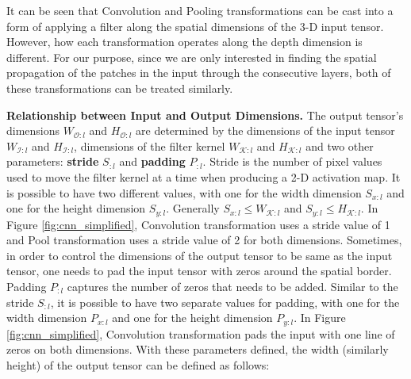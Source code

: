 

It can be seen that Convolution and Pooling transformations can be cast into a form of applying a filter along the spatial dimensions of the 3-D input tensor.
However, how each transformation operates along the depth dimension is different.
For our purpose, since we are only interested in finding the spatial propagation of the patches in the input through the consecutive layers, both of these transformations can be treated similarly.

\vspace{2mm}
\noindent \textbf{Relationship between Input and Output Dimensions.}
The output tensor's dimensions $W_{\mathcal{O}:l}$ and $H_{\mathcal{O}:l}$ are determined by the dimensions of the input tensor $W_{\mathcal{I}:l}$ and $H_{\mathcal{I}:l}$, dimensions of the filter kernel $W_{\mathcal{K}:l}$ and $H_{\mathcal{K}:l}$ and two other parameters: \textbf{stride} $S_{:l}$ and \textbf{padding} $P_{:l}$.
Stride is the number of pixel values used to move the filter kernel at a time when producing a 2-D activation map.
It is possible to have two different values, with one for the width dimension $S_{x:l}$ and one for the height dimension $S_{y:l}$.
Generally $S_{x:l} \leq W_{\mathcal{K}:l}$ and $S_{y:l} \leq H_{\mathcal{K}:l}$.
In Figure \ref{fig:cnn_simplified}, Convolution transformation uses a stride value of 1 and Pool transformation uses a stride value of 2 for both dimensions.
Sometimes, in order to control the dimensions of the output tensor to be same as the input tensor, one needs to pad the input tensor with zeros around the spatial border.
Padding $P_{:l}$ captures the number of zeros that needs to be added.
Similar to the stride $S_{:l}$, it is possible to have two separate values for padding, with one for the width dimension $P_{x:l}$ and one for the height dimension $P_{y:l}$.
In Figure \ref{fig:cnn_simplified}, Convolution transformation pads the input with one line of zeros on both dimensions.
With these parameters defined, the width (similarly height) of the output tensor can be defined as follows:

